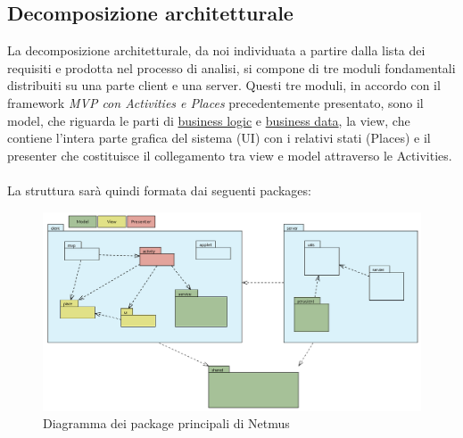 \newpage
\subsection{Decomposizione architetturale}
La decomposizione architetturale, da noi individuata a partire dalla lista dei
requisiti e prodotta nel processo di analisi, si compone di tre moduli
fondamentali distribuiti su una parte client e una server. Questi tre moduli, in
accordo con il framework \emph{MVP con Activities e Places} precedentemente
presentato, sono il model, che riguarda le parti di \underline{business logic} e
\underline{business data}, la view, che contiene l'intera parte grafica del
sistema (UI) con i relativi stati (Places) e il presenter che costituisce il collegamento tra view
e model attraverso le Activities.
\\\\
La struttura sar\`a quindi formata dai seguenti packages:
\begin{figure}[h]
  \centering
  \includegraphics[width=16cm]{img/ST/PackageGeneric.png}
\caption{Diagramma dei package principali di Netmus}
\end{figure}

